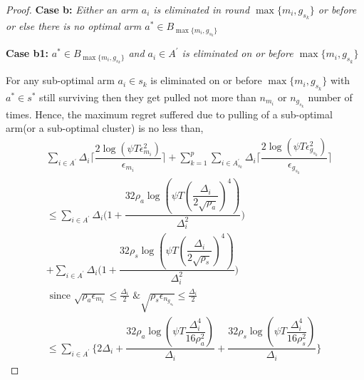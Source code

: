 \begin{proof}

\textbf{Case b:} \textit{Either an arm $a_{i}$ is eliminated in round $\max \lbrace m_{i},g_{s_{k}} \rbrace$ or before or else there is no optimal arm $a^{*}\in B_{\max \lbrace m_{i},g_{s_{k}} \rbrace}$} 

\textbf{Case b1:} \textit{$a^{*}\in B_{\max \lbrace m_{i},g_{s_{k}} \rbrace}$ and $a_{i}\in A^{'}$ is  eliminated on or before $\max \lbrace m_{i},g_{s_{k}} \rbrace$} 




	For any sub-optimal arm $a_{i}\in s_{k}$ is eliminated on or before $\max\lbrace m_{i}, g_{s_{k}} \rbrace$ with $a^{*}\in s^{*}$ still surviving then they get pulled not more than $n_{m_{i}}$ or $n_{g_{s_{k}}}$ number of times. Hence, the maximum regret suffered due to pulling of a sub-optimal arm(or a sub-optimal cluster) is no less than,
 \begin{align*}
 &\sum_{i\in A^{'}}\Delta_{i}\bigg\lceil\dfrac{2\log{(\psi T\epsilon_{m_{i}}^{2})}}{\epsilon_{m_{i}}}\bigg\rceil + \sum_{k=1}^{p}\sum_{i\in A_{s_{k}}^{'}}\Delta_{i}\bigg\lceil\dfrac{2\log{(\psi T\epsilon_{g_{s_{k}}}^{2})}}{\epsilon_{g_{s_{k}}}}\bigg\rceil \\
&\leq\sum_{i\in A^{'}}\Delta_{i}\bigg(1+\dfrac{32\rho_{a}\log{(\psi T(\dfrac{\Delta_{i}}{2\sqrt{\rho_{a}}})^{4})}}{\Delta_{i}^{2}}\bigg) \\
&+ \sum_{i\in A^{'}}\Delta_{i}\bigg(1+\dfrac{32\rho_{s}\log{(\psi T(\dfrac{\Delta_{i}}{2\sqrt{\rho_{s}}})^{4})}}{\Delta_{i}^{2}}\bigg)
\\
&\text{ since } \sqrt{\rho_{a}\epsilon_{m_{i}}}\leq\frac{\Delta_{i}}{2} \text{ \& } \sqrt{\rho_{s}\epsilon_{n_{g_{s_{k}}}}}\leq\frac{\Delta_{i}}{2}
\\
 &\leq \sum_{i\in A^{'}}\bigg\lbrace 2\Delta_{i}+\dfrac{32\rho_{a}\log{(\psi T\dfrac{\Delta_{i}^{4}}{16\rho_{a}^{2}})}}{\Delta_{i}} +\dfrac{32\rho_{s}\log{(\psi T\dfrac{\Delta_{i}^{4}}{16\rho_{s}^{2}})}}{\Delta_{i}}\bigg\rbrace 
 \end{align*}


\end{proof}
